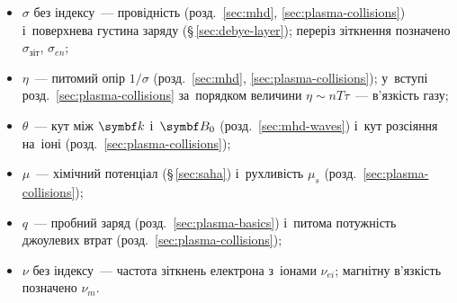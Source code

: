 \begin{itemize}
	\item $\sigma$ без індексу~--- провідність (розд.~\ref{sec:mhd}, \ref{sec:plasma-collisions}) і~поверхнева густина заряду (\S\,\ref{sec:debye-layer}); переріз зіткнення позначено $\sigma_{\mathrm{зіт}}$, $\sigma_{en}$;
	\item $\eta$~--- питомий опір $1/\sigma$ (розд.~\ref{sec:mhd}, \ref{sec:plasma-collisions}); у~вступі розд.~\ref{sec:plasma-collisions} за~порядком величини $\eta\sim nT\tau$~--- в'язкість газу;
	\item $\theta$~--- кут між $\vect k$ і~$\vect B_0$ (розд.~\ref{sec:mhd-waves}) і~кут розсіяння на~іоні (розд.~\ref{sec:plasma-collisions});
	\item $\mu$~--- хімічний потенціал (\S\,\ref{sec:saha}) і~рухливість $\mu_s$ (розд.~\ref{sec:plasma-collisions});
	\item $q$~--- пробний заряд (розд.~\ref{sec:plasma-basics}) і~питома потужність джоулевих втрат (розд.~\ref{sec:plasma-collisions});
	\item $\nu$ без індексу~--- частота зіткнень електрона з~іонами $\nu_{ei}$; магнітну в'язкість позначено $\nu_m$.
\end{itemize}

